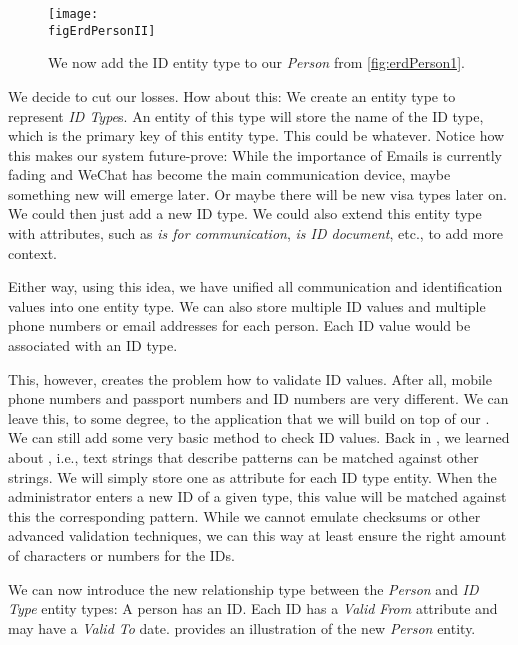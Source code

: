 \begin{figure}%
\centering%
\xdef\figErdPersonII{\currentDir/erdPerson2}%
\texttt{[image: \\figErdPersonII]}%
\caption{We now add the ID entity type to our \emph{Person}  from \cref{fig:erdPerson1}.}%
\label{fig:erdPerson2}%
\end{figure}%

We decide to cut our losses.
How about this:
We create an entity type to represent \emph{ID Type}s.
An entity of this type will store the name of the ID type, which is the primary key of this entity type.
This could be           whatever.
Notice how this makes our system future-prove:
While the importance of Emails is currently fading and WeChat has become the main communication device, maybe something new will emerge later.
Or maybe there will be new visa types later on.
We could then just add a new ID type.
We could also extend this entity type with attributes, such as \emph{is for communication}, \emph{is ID document}, etc., to add more context.

Either way, using this idea, we have unified all communication and identification values into one entity type.
We can also store multiple ID values and multiple phone numbers or email addresses for each person.
Each ID value would be associated with an ID type.

This, however, creates the problem how to validate ID values.
After all, mobile phone numbers and passport numbers and ID numbers are very different.
We can leave this, to some degree, to the application that we will build on top of our \db.
We can still add some very basic method to check ID values.
Back in , we learned about , i.e., text strings that describe patterns can be matched against other strings.
We will simply store one  as  attribute for each ID type entity.
When the administrator enters a new ID of a given type, this value will be matched against this the corresponding pattern.
While we cannot emulate checksums or other advanced validation techniques, we can this way at least ensure the right amount of characters or numbers for the IDs.

We can now introduce the new relationship type between the \emph{Person} and \emph{ID Type} entity types:
A person has an ID.
Each ID has a \emph{Valid From} attribute and may have a \emph{Valid To} date.
 provides an illustration of the new \emph{Person} entity.%
%
\FloatBarrier%
\endhsection%
%

